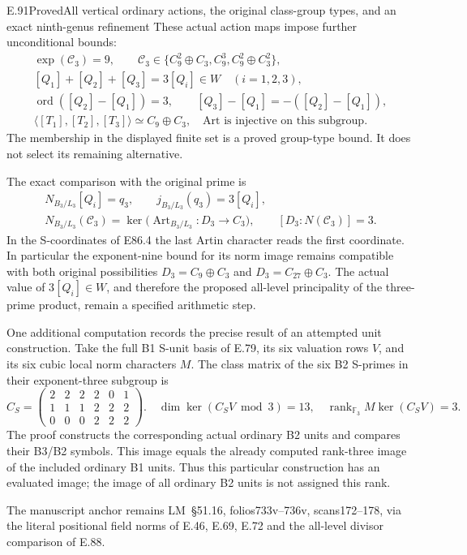 \begin{statement}{E.91}{Proved}{All vertical ordinary actions, the original class-group types, and an exact ninth-genus refinement}
These actual action maps impose further unconditional bounds:
\[
 \begin{gathered}
 \exp(\mathcal C_3)=9,\qquad
 \mathcal C_3\in\{C_9^2\oplus C_3, C_9^3, C_9^2\oplus C_3^2\},\\
 [Q_1]+[Q_2]+[Q_3]=3[Q_i]\in W\quad(i=1,2,3),\\
 \operatorname{ord}([Q_2]-[Q_1])=3,\qquad
 [Q_3]-[Q_1]=-([Q_2]-[Q_1]),\\
 \langle[T_1],[T_2],[T_3]\rangle\simeq C_9\oplus C_3,
 \quad \mathrm{Art}\text{ is injective on this subgroup}.
 \end{gathered}
 \tag{E91.9}
\]
The membership in the displayed finite set is a proved group-type
bound. It does not select its remaining alternative.

The exact comparison with the original prime is
\[
 \begin{gathered}
 N_{B_3/L_3}[Q_i]=q_3,\qquad
 j_{B_3/L_3}(q_3)=3[Q_i],\\
 N_{B_3/L_3}(\mathcal C_3)
   =\ker\bigl(\operatorname{Art}_{B_3/L_3}:D_3\to C_3\bigr),
 \qquad [D_3:N(\mathcal C_3)]=3 .
 \end{gathered}
 \tag{E91.10}
\]
In the S-coordinates of E86.4 the last Artin character reads the
first coordinate. In particular the exponent-nine bound for its
norm image remains compatible with both original possibilities
$D_3=C_9\oplus C_3$ and $D_3=C_{27}\oplus C_3$.
The actual value of $3[Q_i]\in W$, and therefore the proposed
all-level principality of the three-prime product, remain a
specified arithmetic step.

One additional computation records the precise result of an
attempted unit construction. Take the full B1 S-unit basis of
E.79, its six valuation rows $V$, and its six cubic local norm
characters $M$. The class matrix of the six B2 S-primes in
their exponent-three subgroup is
\[
 C_S=\begin{pmatrix}
 2&2&2&2&0&1\\1&1&1&2&2&2\\0&0&0&2&2&2
 \end{pmatrix}.
 \quad
 \dim\ker(C_SV\bmod3)=13,
 \quad \operatorname{rank}_{\mathbb F_3}
          M\ker(C_SV)=3.
 \tag{E91.11}
\]
The proof constructs the corresponding actual ordinary B2 units
and compares their B3/B2 symbols. This image equals the already
computed rank-three image of the included ordinary B1 units.
Thus this particular construction has an evaluated image; the
image of all ordinary B2 units is not assigned this rank.

The manuscript anchor remains LM~\S51.16, folios733v--736v,
scans172--178, via the literal positional field norms of E.46,
E.69, E.72 and the all-level divisor comparison of E.88.
\end{statement}

